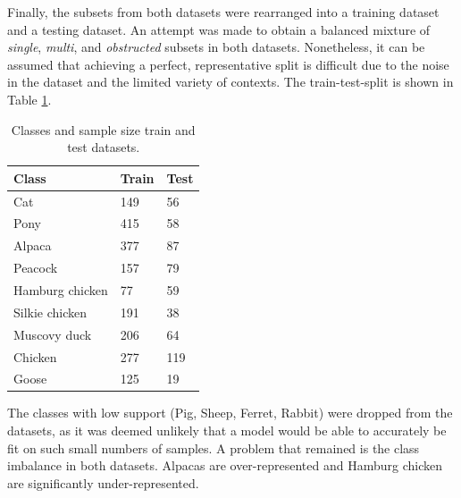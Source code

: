 \documentclass{l4proj}
\begin{document}
Finally, the subsets from both datasets were rearranged into a training dataset and a testing dataset. An attempt was made to obtain a balanced mixture of \textit{single}, \textit{multi}, and \textit{obstructed} subsets in both datasets. Nonetheless, it can be assumed that achieving a perfect, representative split is difficult due to the noise in the dataset and the limited variety of contexts. The train-test-split is shown in Table \ref{table:train_test_dataset}.


\begin{table}[ht]
  \centering
  \begin{tabular}{@{}lll@{}}
    \toprule
    \textbf{Class}  & \textbf{Train } & \textbf{Test} \\ \midrule
    Cat             & 149             & 56 \\
    Pony            & 415             & 58 \\
    Alpaca          & 377             & 87 \\
    Peacock         & 157             & 79 \\
    Hamburg chicken & 77              & 59 \\
    Silkie chicken  & 191             & 38 \\
    Muscovy duck    & 206             & 64 \\
    Chicken         & 277             & 119 \\
    Goose           & 125             & 19 \\ \bottomrule
  \end{tabular}
  \caption{Classes and sample size train and test datasets.}
  \label{table:train_test_dataset}
\end{table}

The classes with low support (Pig, Sheep, Ferret, Rabbit) were dropped from the datasets, as it was deemed unlikely that a model would be able to accurately be fit on such small numbers of samples. A problem that remained is the class imbalance in both datasets. Alpacas are over-represented and Hamburg chicken are significantly under-represented.
\end{document}
